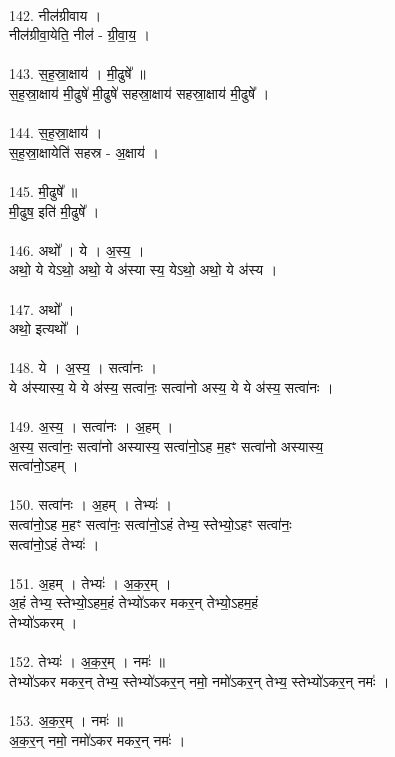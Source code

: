\\
142. नील॑ग्रीवाय ।\\
नील॑ग्रीवा॒येति॒ नील॑ - ग्री॒वा॒य॒ ।\\
\\
143. स॒ह॒स्रा॒क्षाय॑ । मी॒ढुषे᳚ ॥\\
स॒ह॒स्रा॒क्षाय॑ मी॒ढुषे॑ मी॒ढुषे॑ सहस्रा॒क्षाय॑ सहस्रा॒क्षाय॑ मी॒ढुषे᳚ ।\\
\\
144. स॒ह॒स्रा॒क्षाय॑ ।\\
स॒ह॒स्रा॒क्षायेति॑ सहस्र - अ॒क्षाय॑ ।\\
\\
145. मी॒ढुषे᳚ ॥\\
मी॒ढुष॒ इति॑ मी॒ढुषे᳚ ।\\
\\
146. अथो᳚ । ये । अ॒स्य॒ ।\\
अथो॒ ये येऽथो॒ अथो॒ ये अ॑स्या स्य॒ येऽथो॒ अथो॒ ये अ॑स्य ।\\
\\
147. अथो᳚ ।\\
अथो॒ इत्यथो᳚ ।\\
\\
148. ये । अ॒स्य॒ । सत्वा॑नः ।\\
ये अ॑स्यास्य॒ ये ये अ॑स्य॒ सत्वा॑नः॒ सत्वा॑नो अस्य॒ ये ये अ॑स्य॒ सत्वा॑नः ।\\
\\
149. अ॒स्य॒ । सत्वा॑नः । अ॒हम् ।\\
अ॒स्य॒ सत्वा॑नः॒ सत्वा॑नो अस्यास्य॒ सत्वा॑नो॒ऽह म॒हꣳ सत्वा॑नो अस्यास्य॒\\
सत्वा॑नो॒ऽहम् ।\\
\\
150. सत्वा॑नः । अ॒हम् । तेभ्यः॑ ।\\
सत्वा॑नो॒ऽह म॒हꣳ सत्वा॑नः॒ सत्वा॑नो॒ऽहं तेभ्य॒ स्तेभ्यो॒ऽहꣳ सत्वा॑नः॒\\
सत्वा॑नो॒ऽहं तेभ्यः॑ ।\\
\\
151. अ॒हम् । तेभ्यः॑ । अ॒क॒र॒म् ।\\
अ॒हं तेभ्य॒ स्तेभ्यो॒ऽहम॒हं तेभ्यो॑ऽकर मकर॒न् तेभ्यो॒ऽहम॒हं\\
तेभ्यो॑ऽकरम् ।\\
\\
152. तेभ्यः॑ । अ॒क॒र॒म् । नमः॑ ॥\\
तेभ्यो॑ऽकर मकर॒न् तेभ्य॒ स्तेभ्यो॑ऽकर॒न् नमो॒ नमो॑ऽकर॒न् तेभ्य॒ स्तेभ्यो॑ऽकर॒न् नमः॑ ।\\
\\
153. अ॒क॒र॒म् । नमः॑ ॥\\
अ॒क॒र॒न् नमो॒ नमो॑ऽकर मकर॒न् नमः॑ ।\\

